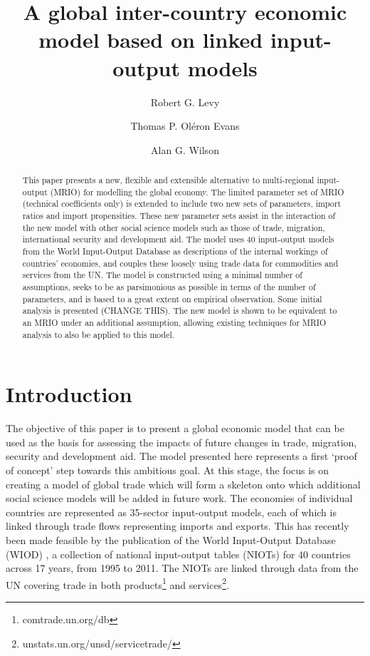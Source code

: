 \documentclass[a4paper]{article}
\title{A global inter-country economic model based on linked input-output models}
\author[*]{Robert G. Levy}
\author[**]{Thomas P. Ol\'{e}ron Evans}
\author[*]{Alan G. Wilson}
\affil[*]{Centre for Advanced Spatial Analysis, UCL Bartlett Faculty of the Built Environment,
90 Tottenham Court Road, London W1T 4TJ, UK}
\affil[**]{Department of Mathematics, University College London, Gower Street, London WC1E 6BT, UK}
\begin{document}
\maketitle

\begin{abstract}
This paper presents a new, flexible and extensible alternative to multi-regional input-output (MRIO) for modelling the global economy.
The limited parameter set of MRIO (technical coefficients only) is extended to include two new sets of parameters, import ratios and import propensities.
These new parameter sets assist in the interaction of the new model with other social science models such as those of trade, migration, international security and development aid.
The model uses 40 input-output models from the World Input-Output Database as descriptions of the internal workings of countries' economies, and couples these loosely using trade data for commodities and services from the UN.
The model is constructed using a minimal number of assumptions, seeks to be as parsimonious as possible in terms of the number of parameters, and is based to a great extent on empirical observation.
Some initial analysis is presented (CHANGE THIS).
The new model is shown to be equivalent to an MRIO under an additional assumption, allowing existing techniques for MRIO analysis to also be applied to this model.
\end{abstract}

\section{Introduction}
The objective of this paper is to present a global economic model that can be used as the basis for assessing the impacts of future changes in trade, migration, security and development aid.
The model presented here represents a first `proof of concept' step towards this ambitious goal.
At this stage, the focus is on creating a model of global trade which will form a skeleton onto which additional social science models will be added in future work.
The economies of individual countries are represented as 35-sector input-output models, each of which is linked through trade flows representing imports and exports.
This has recently been made feasible by the publication of the World Input-Output Database (WIOD) \parencite{timmer_world_2012}, a collection of national input-output tables (NIOTs) for 40 countries across 17 years, from 1995 to 2011.
The NIOTs are linked through data from the UN covering trade in both products\footnote{comtrade.un.org/db} and services\footnote{unstats.un.org/unsd/servicetrade/}.
\end{document}
